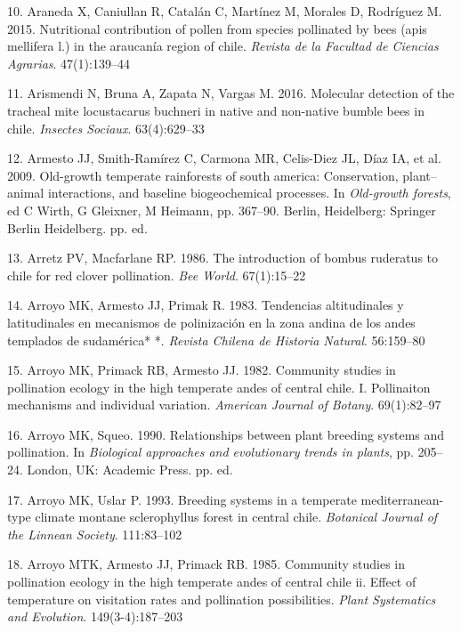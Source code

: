 \documentclass[
]{article}
\begin{document}
\leavevmode\hypertarget{ref-RN11}{}%
10. Araneda X, Caniullan R, Catalán C, Martínez M, Morales D, Rodríguez
M. 2015. Nutritional contribution of pollen from species pollinated by
bees (apis mellifera l.) in the araucanía region of chile. \emph{Revista
de la Facultad de Ciencias Agrarias}. 47(1):139--44

\leavevmode\hypertarget{ref-RN13}{}%
11. Arismendi N, Bruna A, Zapata N, Vargas M. 2016. Molecular detection
of the tracheal mite locustacarus buchneri in native and non-native
bumble bees in chile. \emph{Insectes Sociaux}. 63(4):629--33

\leavevmode\hypertarget{ref-RN14}{}%
12. Armesto JJ, Smith-Ramírez C, Carmona MR, Celis-Diez JL, Díaz IA, et
al. 2009. Old-growth temperate rainforests of south america:
Conservation, plant--animal interactions, and baseline biogeochemical
processes. In \emph{Old-growth forests}, ed C Wirth, G Gleixner, M
Heimann, pp. 367--90. Berlin, Heidelberg: Springer Berlin Heidelberg.
pp. ed.

\leavevmode\hypertarget{ref-RN15}{}%
13. Arretz PV, Macfarlane RP. 1986. The introduction of bombus ruderatus
to chile for red clover pollination. \emph{Bee World}. 67(1):15--22

\leavevmode\hypertarget{ref-RN16}{}%
14. Arroyo MK, Armesto JJ, Primak R. 1983. Tendencias altitudinales y
latitudinales en mecanismos de polinización en la zona andina de los
andes templados de sudamérica* *. \emph{Revista Chilena de Historia
Natural}. 56:159--80

\leavevmode\hypertarget{ref-RN167}{}%
15. Arroyo MK, Primack RB, Armesto JJ. 1982. Community studies in
pollination ecology in the high temperate andes of central chile. I.
Pollinaiton mechanisms and individual variation. \emph{American Journal
of Botany}. 69(1):82--97

\leavevmode\hypertarget{ref-RN93}{}%
16. Arroyo MK, Squeo. 1990. Relationships between plant breeding systems
and pollination. In \emph{Biological approaches and evolutionary trends
in plants}, pp. 205--24. London, UK: Academic Press. pp. ed.

\leavevmode\hypertarget{ref-RN166}{}%
17. Arroyo MK, Uslar P. 1993. Breeding systems in a temperate
mediterranean-type climate montane sclerophyllus forest in central
chile. \emph{Botanical Journal of the Linnean Society}. 111:83--102

\leavevmode\hypertarget{ref-RN102}{}%
18. Arroyo MTK, Armesto JJ, Primack RB. 1985. Community studies in
pollination ecology in the high temperate andes of central chile ii.
Effect of temperature on visitation rates and pollination possibilities.
\emph{Plant Systematics and Evolution}. 149(3-4):187--203
\end{document}
